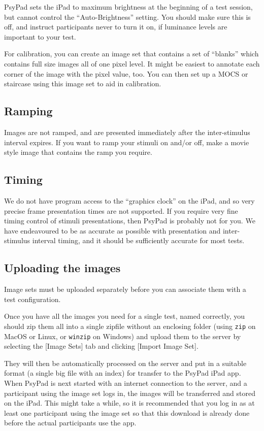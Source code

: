 \documentclass{article}
\begin{document}
PsyPad sets the iPad to maximum brightness at the beginning of a
test session, but cannot control the ``Auto-Brightness'' setting.
You should make sure this is off, and instruct participants never
to turn it on, if luminance levels are important to your test.

For calibration, you can create an image set that contains 
a set of ``blanks'' which contains full size images 
all of one pixel level. It might be easiest to annotate each corner of the
image with the pixel value, too.
You can then set up a MOCS or staircase using this image set 
to aid in calibration.

\subsection{Ramping} 

Images are not ramped, and are presented
immediately after the inter-stimulus interval expires.  
If you want to ramp your stimuli on and/or off, make a movie style
image that contains the ramp you require.

\subsection{Timing} 

We do not have program access to the ``graphics clock'' on the iPad,
and so very precise frame presentation times are not supported.  If
you require very fine timing control of stimuli presentations, then
PsyPad is probably not for you.  We have endeavoured to be as
accurate as possible with presentation and inter-stimulus interval
timing, and it should be sufficiently accurate for most tests.

\subsection{Uploading the images}

Image sets must be uploaded separately before you can associate them with a test configuration.

Once you have all the images you need for a single test, named correctly,
you should zip them all into a single zipfile without an enclosing folder (using {\tt zip} on MacOS or Linux, or {\tt winzip} on Windows) and upload them to the server by selecting the [Image Sets] tab and clicking [Import Image Set].

They will then be automatically processed on the server and put in a suitable format (a single big file with an index) for transfer to the PsyPad iPad app. When PsyPad is next started with an internet connection to the server, and a participant using the image set logs in, the images will be transferred and stored on the iPad. This might take a while, so it is recommended that you log in as at least one participant using the 
image set so that this download is already done before the actual participants
use the app.
\end{document}
